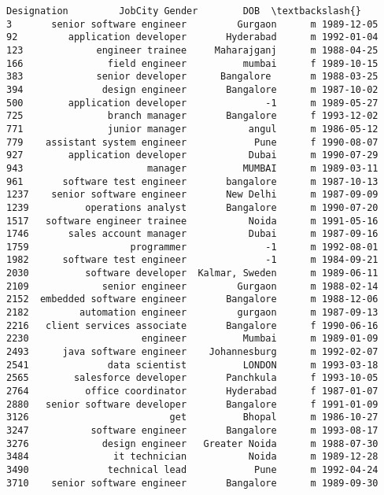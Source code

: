 \documentclass[11pt]{article}
\begin{document}
\begin{tcolorbox}[breakable, size=fbox, boxrule=.5pt, pad at break*=1mm, opacityfill=0]
\begin{Verbatim}[commandchars=\\\{\}]
                     Designation         JobCity Gender        DOB  \textbackslash{}
3       senior software engineer         Gurgaon      m 1989-12-05
92         application developer       Hyderabad      m 1992-01-04
123             engineer trainee     Maharajganj      m 1988-04-25
166               field engineer          mumbai      f 1989-10-15
383             senior developer      Bangalore       m 1988-03-25
394              design engineer       Bangalore      m 1987-10-02
500        application developer              -1      m 1989-05-27
725               branch manager       Bangalore      f 1993-12-02
771               junior manager           angul      m 1986-05-12
779    assistant system engineer            Pune      f 1990-08-07
927        application developer           Dubai      m 1990-07-29
943                      manager          MUMBAI      m 1989-03-11
961       software test engineer       bangalore      m 1987-10-13
1237    senior software engineer       New Delhi      m 1987-09-09
1239          operations analyst       Bangalore      m 1990-07-20
1517   software engineer trainee           Noida      m 1991-05-16
1746       sales account manager           Dubai      m 1987-09-16
1759                  programmer              -1      m 1992-08-01
1982      software test engineer              -1      m 1984-09-21
2030          software developer  Kalmar, Sweden      m 1989-06-11
2109             senior engineer         Gurgaon      m 1988-02-14
2152  embedded software engineer       Bangalore      m 1988-12-06
2182         automation engineer         gurgaon      m 1987-09-13
2216   client services associate       Bangalore      f 1990-06-16
2230                    engineer          Mumbai      m 1989-01-09
2493      java software engineer    Johannesburg      m 1992-02-07
2541              data scientist          LONDON      m 1993-03-18
2565        salesforce developer       Panchkula      f 1993-10-05
2764          office coordinator       Hyderabad      f 1987-01-07
2880   senior software developer       Bangalore      f 1991-01-09
3126                         get          Bhopal      m 1986-10-27
3247           software engineer       Bangalore      m 1993-08-17
3276             design engineer   Greater Noida      m 1988-07-30
3484               it technician           Noida      m 1989-12-28
3490              technical lead            Pune      m 1992-04-24
3710    senior software engineer       Bangalore      m 1989-09-30


\end{Verbatim}
\end{tcolorbox}
\end{document}
